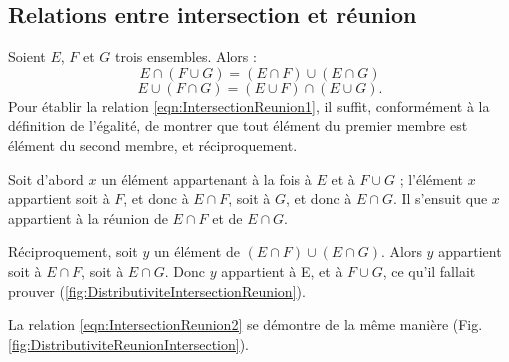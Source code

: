 \documentclass[12pt,parskip=full,chapterprefix=true,a5paper]{scrbook}
\begin{document}
\subsection*{Relations entre intersection et réunion}

Soient \(E\), \(F\) et \(G\) trois ensembles. Alors :
\begin{equation}
  \label{eqn:IntersectionReunion1}
  E\cap(F\cup G)=(E\cap F)\cup(E\cap G)
\end{equation}
\begin{equation}
  \label{eqn:IntersectionReunion2}
  E\cup(F\cap G)=(E\cup F)\cap(E\cup G).
\end{equation}
Pour établir la relation \ref{eqn:IntersectionReunion1}, il suffit, conformément à la définition de l'égalité, de montrer que tout élément du premier membre est élément du second membre, et réciproquement.

Soit d'abord \(x\) un élément appartenant à la fois à \(E\) et à \(F\cup G\) ; l'élément \(x\) appartient soit à \(F\), et donc à \(E\cap F\), soit à \(G\), et donc à \(E\cap G\). Il s'ensuit que \(x\) appartient à la réunion de \(E\cap F\) et de \(E\cap G\).

Réciproquement, soit \(y\) un élément de \((E\cap F)\cup(E\cap G)\). Alors \(y\) appartient soit à \(E\cap F\), soit à \(E\cap G\). Donc \(y\) appartient à E, et à \(F\cup G\), ce qu'il fallait prouver (\ref{fig:DistributiviteIntersectionReunion}).

La relation \ref{eqn:IntersectionReunion2} se démontre de la même manière (Fig. \ref{fig:DistributiviteReunionIntersection}).

\backmatter

\printindex
\end{document}
